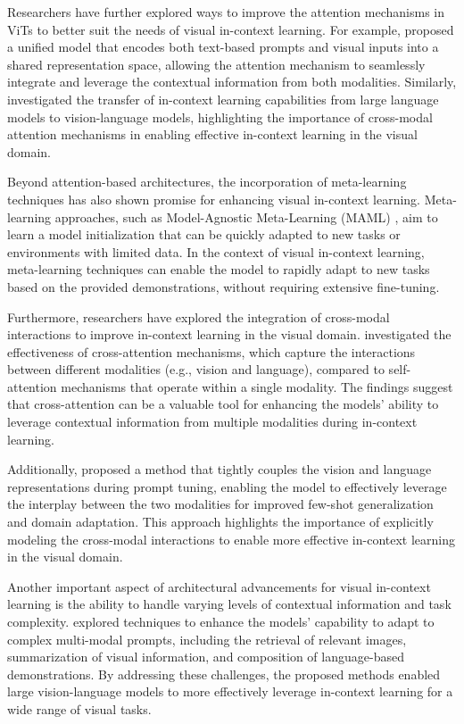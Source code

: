 \documentclass[11pt]{article}
\begin{document}
Researchers have further explored ways to improve the attention mechanisms in ViTs to better suit the needs of visual in-context learning. For example, \cite{ref11} proposed a unified model that encodes both text-based prompts and visual inputs into a shared representation space, allowing the attention mechanism to seamlessly integrate and leverage the contextual information from both modalities. Similarly, \cite{ref241} investigated the transfer of in-context learning capabilities from large language models to vision-language models, highlighting the importance of cross-modal attention mechanisms in enabling effective in-context learning in the visual domain.

Beyond attention-based architectures, the incorporation of meta-learning techniques has also shown promise for enhancing visual in-context learning. Meta-learning approaches, such as Model-Agnostic Meta-Learning (MAML) \cite{ref242}, aim to learn a model initialization that can be quickly adapted to new tasks or environments with limited data. In the context of visual in-context learning, meta-learning techniques can enable the model to rapidly adapt to new tasks based on the provided demonstrations, without requiring extensive fine-tuning.

Furthermore, researchers have explored the integration of cross-modal interactions to improve in-context learning in the visual domain. \cite{ref243} investigated the effectiveness of cross-attention mechanisms, which capture the interactions between different modalities (e.g., vision and language), compared to self-attention mechanisms that operate within a single modality. The findings suggest that cross-attention can be a valuable tool for enhancing the models' ability to leverage contextual information from multiple modalities during in-context learning.

Additionally, \cite{ref244} proposed a method that tightly couples the vision and language representations during prompt tuning, enabling the model to effectively leverage the interplay between the two modalities for improved few-shot generalization and domain adaptation. This approach highlights the importance of explicitly modeling the cross-modal interactions to enable more effective in-context learning in the visual domain.

Another important aspect of architectural advancements for visual in-context learning is the ability to handle varying levels of contextual information and task complexity. \cite{ref130} explored techniques to enhance the models' capability to adapt to complex multi-modal prompts, including the retrieval of relevant images, summarization of visual information, and composition of language-based demonstrations. By addressing these challenges, the proposed methods enabled large vision-language models to more effectively leverage in-context learning for a wide range of visual tasks.
\end{document}
